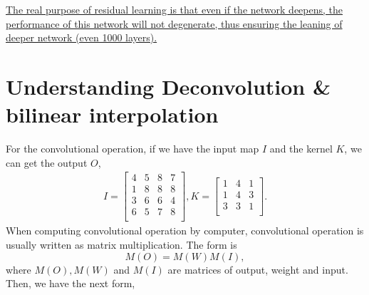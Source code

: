\documentclass[10pt,onecolumn]{book}
\begin{document}
\uline{The real purpose of residual learning is that even if the network deepens, the performance of this network will not degenerate, thus ensuring the leaning of deeper network (even 1000 layers).}

\section{Understanding Deconvolution \& bilinear interpolation}
For the convolutional operation, if we have the input map $I$ and the kernel $K$, we can get the output $O$,
\begin{equation}
\begin{split}
I = \left[
	\begin{matrix}
	4 & 5 & 8 & 7 \\
	1 & 8 & 8 & 8 \\
	3 & 6 & 6 & 4 \\
	6 & 5 & 7 & 8 \\
	\end{matrix} 
	\right],
K = \left[
	\begin{matrix}
	1 & 4 & 1 \\
	1 & 4 & 3 \\
	3 & 3 & 1 \\
	\end{matrix}
	\right].
\end{split}
\end{equation}
When computing convolutional operation by computer, convolutional operation is usually written as matrix multiplication. The form is 
\begin{equation}
M(O) = M(W) M(I),
\end{equation}
where $M(O), M(W)$ and $M(I)$ are matrices of output, weight and input. 
Then, we have the next form,
\end{document}
